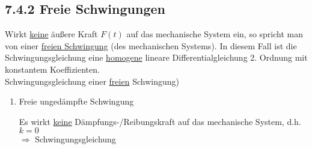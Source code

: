 \placeholder

\subsection{7.4.2 Freie Schwingungen}
Wirkt \ul{keine} äußere Kraft $F(t)$ auf das mechanische System ein, so spricht man von einer \ul{freien Schwingung} (des mechanischen Systems). In diesem Fall ist die Schwingungsgleichung eine \ul{homogene} lineare Differentialgleichung 2. Ordnung mit konstantem Koeffizienten.\\
\hhspace{2cm}\qquad Schwingungsgleichung einer \ul{freien} Schwingung)

\begin{enumerate}[A]
	\item Freie ungedämpfte Schwingung
	
	Es wirkt \ul{keine} Dämpfungs-/Reibungskraft auf das mechanische System, d.h. $k=0$\\
	$\Rightarrow$ Schwingungsgleichung\\
	\hhspace{2cm}
	

\end{enumerate}
